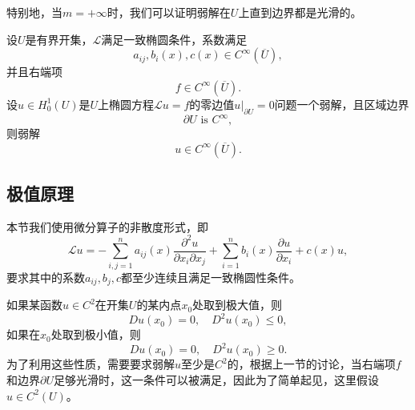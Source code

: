 \documentclass[a4paper,10pt]{ctexart}
\begin{document}
特别地，当$ m=+\infty $时，我们可以证明弱解在$ U $上直到边界都是光滑的。
\begin{theorem}
    设$ U $是有界开集，$ \mathcal{L} $满足一致椭圆条件，系数满足
    \[
        a_{ij},b_i(x),c(x)\in C^{\infty}(\overline{U}),
    \]
    并且右端项
    \[
        f\in C^{\infty}(\overline{U}).
    \]
    设$ u\in H^1_0(U) $是$ U $上椭圆方程$ \mathcal{L}u = f $的零边值$ u|_{\partial U} = 0 $问题一个弱解，且区域边界
    \begin{equation}
        \partial U \text{ is } C^{\infty},
    \end{equation}
    则弱解
    \begin{equation}
        u \in C^{\infty}(\overline{U}).
    \end{equation}
\end{theorem}

\subsection{极值原理}
本节我们使用微分算子的非散度形式，即
\[
    \mathcal{L}u = -\sum_{i,j=1}^n a_{ij}(x) \dfrac{\partial^2 u}{\partial x_i \partial x_j} + \sum_{i=1}^n b_i(x) \dfrac{\partial u}{\partial x_i} + c(x)u,
\]
要求其中的系数$ a_{ij},b_j,c $都至少连续且满足一致椭圆性条件。

如果某函数$ u\in C^2 $在开集$ U $的某内点$ x_0 $处取到极大值，则
\[
    Du(x_0) = 0,\quad D^2u(x_0) \leqslant 0,
\]
如果在$ x_0 $处取到极小值，则
\[
    Du(x_0) = 0,\quad D^2u(x_0) \geqslant 0.
\]
为了利用这些性质，需要要求弱解$ u $至少是$ C^2 $的，根据上一节的讨论，当右端项$ f $和边界$ \partial U $足够光滑时，这一条件可以被满足，因此为了简单起见，这里假设$ u\in C^2(U) $。
\end{document}
